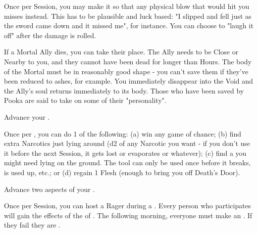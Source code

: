 \begin{multicols*}{2}

Once per Session, you may make it so that any physical blow that would hit you misses instead.  This has to be plausible and luck based: "I slipped and fell just as the sword came down and it missed me", for instance.  You can choose to "laugh it off" after the damage is rolled.


If a Mortal Ally dies, you can take their place.  The Ally needs to be Close or Nearby to you, and they cannot have been dead for longer than Hours.  The body of the Mortal must be in reasonably good shape - you can't save them if they've been reduced to ashes, for example.  You immediately disappear into the Void and the Ally's soul returns immediately to its body. Those who have been saved by Pooka are said to take on some of their "personality".


Advance your  \DCUP.


 Once per , you can do 1 of the following:  (a) win any game of chance; (b) find extra Narcotics just lying around (d2 \UD of any Narcotic you want - if you don't use it before the next Session, it gets lost or evaporates or whatever); (c) find a  you might need lying on the ground. The tool can only be used once before it breaks, is used up, etc.; or (d) regain 1 Flesh (enough to bring you off Death's Door).




Advance two  aspects of your  \DCUP.


Once per Session, you can host a Rager during a .  Every person who participates will gain the effects of the  of . The following morning, everyone must make an \RSTRY{\VIG}. If they fail they are .

\newpage


\end{multicols*}

